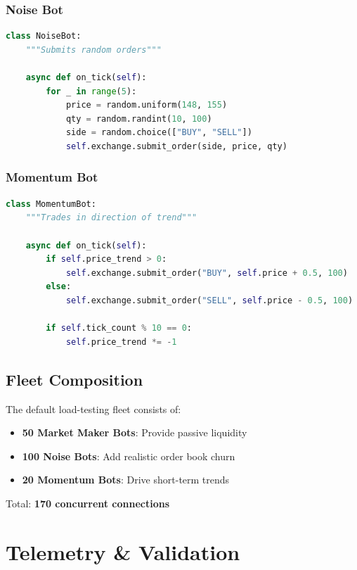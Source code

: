 \documentclass[10pt,a4paper,oneside]{report}
\begin{document}
\subsection{Noise Bot}

\begin{lstlisting}[language=python]
class NoiseBot:
    """Submits random orders"""

    async def on_tick(self):
        for _ in range(5):
            price = random.uniform(148, 155)
            qty = random.randint(10, 100)
            side = random.choice(["BUY", "SELL"])
            self.exchange.submit_order(side, price, qty)
\end{lstlisting}

\subsection{Momentum Bot}

\begin{lstlisting}[language=python]
class MomentumBot:
    """Trades in direction of trend"""

    async def on_tick(self):
        if self.price_trend > 0:
            self.exchange.submit_order("BUY", self.price + 0.5, 100)
        else:
            self.exchange.submit_order("SELL", self.price - 0.5, 100)

        if self.tick_count % 10 == 0:
            self.price_trend *= -1
\end{lstlisting}

\section{Fleet Composition}

The default load-testing fleet consists of:

\begin{itemize}
    \item \textbf{50 Market Maker Bots}: Provide passive liquidity
    \item \textbf{100 Noise Bots}: Add realistic order book churn
    \item \textbf{20 Momentum Bots}: Drive short-term trends
\end{itemize}

Total: \textbf{170 concurrent connections}

\chapter{Telemetry \& Validation}
\end{document}
